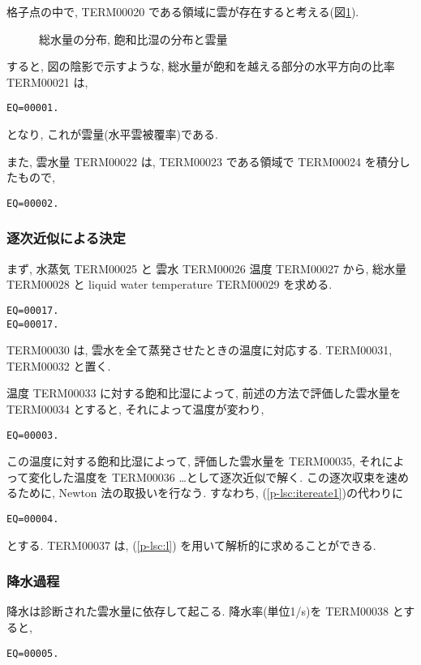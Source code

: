 格子点の中で,
TERM00020 である領域に雲が存在すると考える(図\ref{lsc:fig-cloud}).

\begin{figure}[hbtp]
  \begin{center}
  \end{center}
  \caption{総水量の分布, 飽和比湿の分布と雲量}
  \label{lsc:fig-cloud}
\end{figure}


すると, 図の陰影で示すような,
総水量が飽和を越える部分の水平方向の比率 TERM00021 は,
\begin{verbatim}
EQ=00001.
\end{verbatim}
となり, これが雲量(水平雲被覆率)である.

また, 雲水量 TERM00022 は, TERM00023 である領域で
TERM00024 を積分したもので,
\begin{verbatim}
EQ=00002.
\end{verbatim}

\subsubsection{逐次近似による決定}

まず, 水蒸気 TERM00025 と 雲水 TERM00026 温度 TERM00027 から,
総水量 TERM00028 と liquid water temperature TERM00029 を求める.
\begin{verbatim}
EQ=00017.
EQ=00017.
\end{verbatim}
TERM00030 は, 雲水を全て蒸発させたときの温度に対応する.
TERM00031, TERM00032 と置く.

温度 TERM00033 に対する飽和比湿によって, 
前述の方法で評価した雲水量を TERM00034 とすると,
それによって温度が変わり,
\begin{verbatim}
EQ=00003.
\end{verbatim}
この温度に対する飽和比湿によって, 評価した雲水量を TERM00035,
それによって変化した温度を TERM00036 \ldots として逐次近似で解く.
この逐次収束を速めるために, Newton 法の取扱いを行なう.
すなわち, (\ref{p-lsc:itereate1})の代わりに
\begin{verbatim}
EQ=00004.
\end{verbatim}
とする.
TERM00037 は, (\ref{p-lsc:l}) を用いて解析的に求めることができる.

\subsubsection{降水過程}

降水は診断された雲水量に依存して起こる.
降水率(単位1/s)を TERM00038 とすると,
\begin{verbatim}
EQ=00005.
\end{verbatim}

